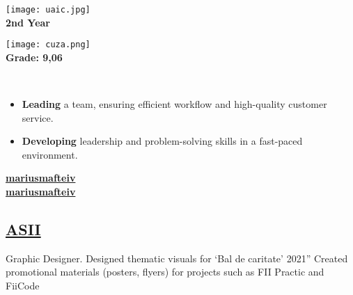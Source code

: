 \documentclass[a4paper]{MagicalCV}
\begin{document}
\lastupdated


\hfill \break





\begin{minipage}[t]{0.38\textwidth} 



\texttt{[image: uaic.jpg]} 
 \\
\vspace{\topsep} %
\textbf {2nd Year}
\sectionsep

\texttt{[image: cuza.png]} 
\\ 
\vspace{\topsep} %
\textbf {Grade: 9,06}
\sectionsep

\\ 
\begin{itemize}
    \item \textbf{Leading} a team, ensuring efficient workflow and high-quality customer service.  
    \item \textbf{Developing} leadership and problem-solving skills in a fast-paced environment.
\end{itemize}
\sectionsep


 \href{https://github.com/mariusmafteiv}{\bf mariusmafteiv} \\
 \href{https://www.linkedin.com/in/mariusmafteiv/}{\bf mariusmafteiv}
\sectionsep

\subsection{\href{https://www.asii.ro/}{ASII}}
Graphic Designer.
Designed thematic visuals for ‘Bal de caritate’ 2021”
Created promotional materials (posters, flyers) for projects such as FII Practic and FiiCode
\sectionsep


\end{minipage}
\end{document}
